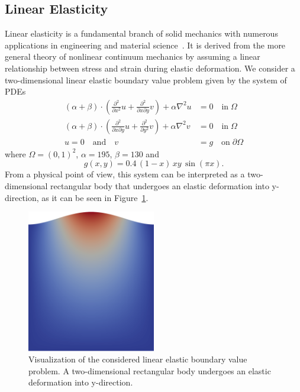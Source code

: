 \subsection{Linear Elasticity}
Linear elasticity is a fundamental branch of solid mechanics with numerous applications in engineering and material science~\cite{holzapfel2001nonlinear}.
It is derived from the more general theory of nonlinear continuum mechanics by assuming a linear relationship between stress and strain during elastic deformation.
We consider a two-dimensional linear elastic boundary value problem given by the system of PDEs
\begin{equation}
	\begin{split}
		(\alpha + \beta) \cdot (\frac{\partial^2}{\partial x^2} u + \frac{\partial^2}{\partial x \partial y} v) + \alpha \nabla^2 u & = 0 \quad \text{in} \; \Omega \\
		(\alpha + \beta) \cdot (\frac{\partial^2}{\partial x \partial y} u + \frac{\partial^2}{\partial y^2} v) + \alpha \nabla^2 v & = 0 \quad \text{in} \; \Omega \\
		u = 0 \quad \text{and} \quad v & = g \quad \text{on} \; \partial \Omega 
		\label{eq:linear-elasticity}
	\end{split}
\end{equation}
where $\Omega = (0,1)^2$, $\alpha = 195$, $\beta = 130$ and
\begin{equation*}
	g(x,y) = 0.4 \, (1 - x) \, x y \, \sin(\pi x).
\end{equation*}
From a physical point of view, this system can be interpreted as a two-dimensional rectangular body that undergoes an elastic deformation into y-direction, as it can be seen in Figure~\ref{fig:visualization-linear-elasticity}.
\begin{figure}
	\centering
	\includegraphics[width=0.5\textwidth]{figures/visualization-linear-elasticity1}
	\caption{Visualization of the considered linear elastic boundary value problem. A two-dimensional rectangular body undergoes an elastic deformation into y-direction.}
	\label{fig:visualization-linear-elasticity}
\end{figure}
